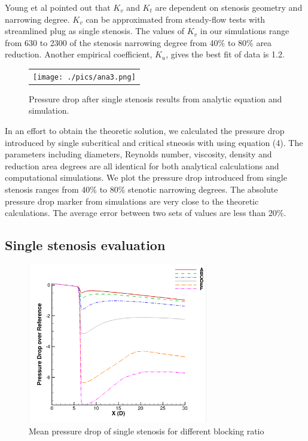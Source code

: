 Young et al\cite{Young&Cholvin} pointed out that $K_v$ and $K_t$ are dependent on stenosis geometry and narrowing degree.
$K_v$ can be approximated from steady-flow tests with streamlined plug as single stenosis.
The values of $K_v$ in our simulations range from 630 to 2300 of the stenosis narrowing degree from 40\% to 80\% area reduction.
Another empirical coefficient, $K_u$, gives the best fit of data is 1.2.

\begin{figure}[H]
	\centering
	\begin{tabular}{c}
		\texttt{[image: ./pics/ana3.png]}
	\end{tabular}
	\caption{\footnotesize Pressure drop after single stenosis results from analytic equation and simulation.} \label{fig: single verification}
\end{figure}

In an effort to obtain the theoretic solution, we calculated the pressure drop introduced by single subcritical and critical stneosis with using equation (4).
The parameters including diameters, Reynolds number, viscosity, density and reduction area degrees are all identical for both analytical calculations and computational simulations.
We plot the pressure drop introduced from single stenosis ranges from 40\% to 80\% stenotic narrowing degrees.
The absolute pressure drop marker from simulations are very close to the theoretic calculations. 
The average error between two sets of values are less than 20\%. 


\subsection{Single stenosis evaluation}

\begin{figure}[H]
	\centering
	\includegraphics[trim= 1mm 0mm 1mm 0mm,clip,width=0.70\textwidth]{./pics/increase.png}
	\caption{Mean pressure drop of single stenosis for different blocking ratio}
	\label{fig:single increase}
\end{figure}

